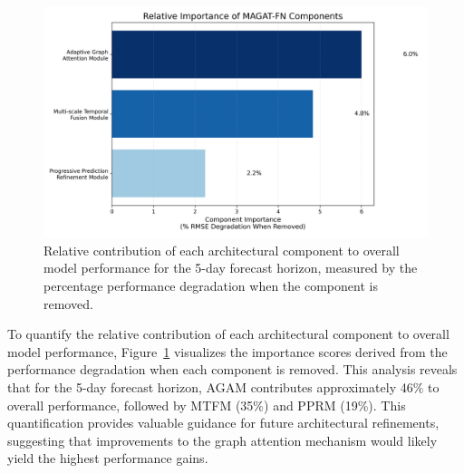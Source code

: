 \documentclass[lettersize, journal]{IEEEtran}
\begin{document}
\begin{figure}[htbp]
    \centering
    \includegraphics[width=\columnwidth]{../../figures/component_importance_japan.w-20.h-5.png}
    \caption{Relative contribution of each architectural component to overall model performance for the 5-day forecast horizon, measured by the percentage performance degradation when the component is removed.}
    \label{fig:component_importance}
\end{figure}

To quantify the relative contribution of each architectural component to overall model performance, Figure~\ref{fig:component_importance} visualizes the importance scores derived from the performance degradation when each component is removed. This analysis reveals that for the 5-day forecast horizon, AGAM contributes approximately 46\% to overall performance, followed by MTFM (35\%) and PPRM (19\%). This quantification provides valuable guidance for future architectural refinements, suggesting that improvements to the graph attention mechanism would likely yield the highest performance gains.
\end{document}
